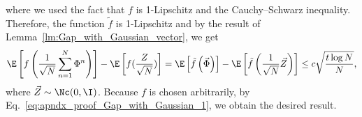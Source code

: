 % 
where we used the fact that $f$ is 1-Lipschitz and the Cauchy–Schwarz inequality. Therefore, the function $\tilde{f}$ is 1-Lipschitz and by the result of Lemma~\ref{lm:Gap_with_Gaussian_vector}, we get
% 
\begin{equation*}
    \E\left[f\left(\frac{1}{\sqrt{N}}\sum_{n=1}^N \Phi^n\right)\right] - \E\left[f(\frac{Z}{\sqrt{N}})\right]
    = \E\left[\tilde{f}\left(\Vec{\Phi}\right)\right] - \E\left[\tilde{f}\left(\frac{1}{\sqrt{N}}\Vec{Z}\right)\right]
    \leq 
    c\sqrt{\frac{t \log N}{N}},
\end{equation*}
% 
where $\Vec{Z} \sim \Nc(0,\I)$. Because $f$ is chosen arbitrarily, by Eq.~\eqref{eq:apndx_proof_Gap_with_Gaussian_1}, we obtain the desired result. \ep
